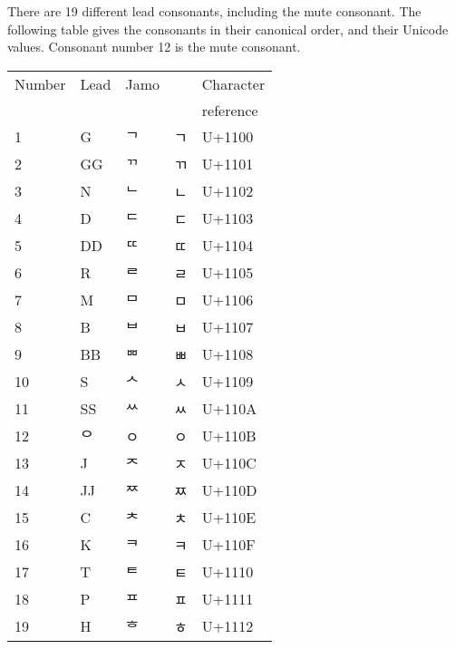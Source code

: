 There are 19 different lead consonants, including the mute consonant. The following table gives the consonants in their canonical order, and their Unicode values. Consonant number 12 is the mute consonant.

\begingroup
{}%
\begin{longtable}{ll >{\korean}l >{\korean}l >{\ttfamily}l}
\toprule
Number	&Lead	&Jamo	& &Character\\ 
        &     &     & &reference\\
\midrule                     
1	&G	&ᄀ	&ㄱ	&U+1100\\
2	&GG	&ᄁ	&ㄲ	&U+1101\\
3	&N	   &ᄂ	&ㄴ	&U+1102\\
4	&D	 &ᄃ	&ㄷ	&U+1103\\
5	&DD	&ᄄ	&ㄸ	&U+1104\\
6	&R	&ᄅ	&ㄹ	&U+1105\\
7	&M	&ᄆ	&ㅁ	&U+1106\\
8	&B	&ᄇ	&ㅂ	&U+1107\\
9	&BB	&ᄈ	&ㅃ	&U+1108\\
10	&S	&ᄉ	&ㅅ	&U+1109\\
11	&SS	&ᄊ	&ㅆ	&U+110A\\
12	&ᄋ	&ㅇ	&ㅇ&U+110B\\
13	&J	  &ᄌ	&ㅈ	&U+110C\\
14	&JJ	&ᄍ	&ㅉ	&U+110D\\
15	&C	   &ᄎ	&ㅊ	&U+110E\\
16	&K	   &ᄏ	&ㅋ	&U+110F\\
17	&T	   &ᄐ	&ㅌ	&U+1110\\
18	&P	   &ᄑ	&ㅍ	&U+1111\\
19	&H	   &ᄒ	&ㅎ	&U+1112\\
\bottomrule
\end{longtable}
\endgroup

